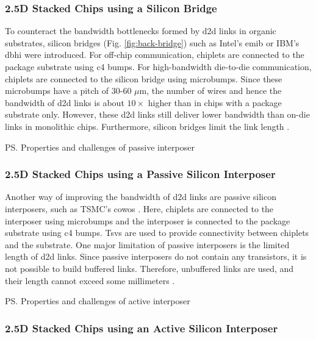 \subsubsection{2.5D Stacked Chips using a Silicon Bridge}
\label{sssec:back-bridge}

To counteract the bandwidth bottlenecks formed by \gls{d2d} links in organic substrates, silicon bridges (Fig. \ref{fig:back-bridge}) such as Intel's \gls{emib} \cite{emib} or IBM's \gls{dbhi} \cite{dbhi} were introduced.
For off-chip communication, chiplets are connected to the package substrate using \gls{c4} bumps.
For high-bandwidth die-to-die communication, chiplets are connected to the silicon bridge using microbumps.
Since these microbumps have a pitch of $30$-$60$ $\mu$m, the number of wires and hence the bandwidth of \gls{d2d} links is about $10\times$ higher than in chips with a package substrate only.
However, these \gls{d2d} links still deliver lower bandwidth than on-die links in monolithic chips.
Furthermore, silicon bridges limit the link length \cite{emib, sib-2}.

\ps{Properties and challenges of passive interposer}

\subsubsection{2.5D Stacked Chips using a Passive Silicon Interposer}
\label{sssec:back-interposer-passive}

Another way of improving the bandwidth of \gls{d2d} links are passive silicon interposers, such as TSMC's \gls{cowos} \cite{cowos}.
Here, chiplets are connected to the interposer using microbumps and the interposer is connected to the package substrate using \gls{c4} bumps.
\gls{Tsvs} are used to provide connectivity between chiplets and the substrate.
One major limitation of passive interposers is the limited length of \gls{d2d} links.
Since passive interposers do not contain any transistors, it is not possible to build buffered links.
Therefore, unbuffered links are used, and their length cannot exceed some millimeters \cite{ucie, bow, bow-spec}.

\ps{Properties and challenges of active interposer}

\subsubsection{2.5D Stacked Chips using an Active Silicon Interposer}
\label{sssec:back-interposer-active}

